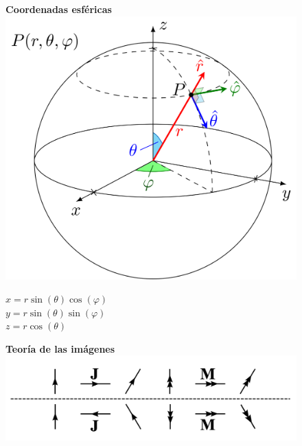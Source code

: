 \documentclass[twocolumn, 8pt]{extarticle}
\begin{document}
\begin{figure}[H]
	\centering
	\textbf{Coordenadas esféricas}
	\includegraphics[scale=0.1]{esfericas.png}
	\vspace{0.1cm}

	\(x = r \sin(\theta) \cos(\varphi)\)\\
	\(y = r \sin(\theta) \sin(\varphi)\)\\
	\(z = r \cos(\theta)\)
\end{figure}

\begin{figure}[H]
	\centering
	\textbf{Teoría de las imágenes}
	\includegraphics[width=\columnwidth]{teoria_imagenes.png}
\end{figure}
\end{document}
